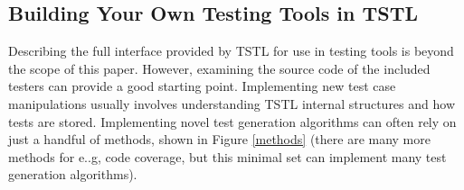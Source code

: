 \subsection{Building Your Own Testing Tools in TSTL}
\label{sec:build}

Describing the full interface provided by TSTL for use in testing tools is beyond the scope of this paper.  However, examining the source code of the included testers can provide a good starting point.  Implementing new test case manipulations usually involves understanding TSTL internal structures and how tests are stored.  Implementing novel test generation algorithms can often rely on just a handful of methods, shown in Figure \ref{methods} (there are many more methods for e..g, code coverage, but this minimal set can implement many test generation algorithms).

